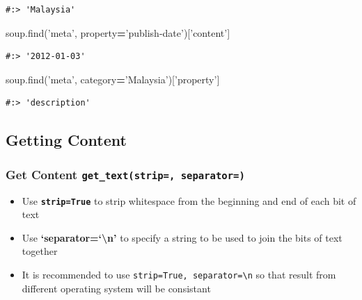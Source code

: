 \documentclass[
]{book}
\newenvironment{Shaded}{\begin{snugshade}}{\end{snugshade}}
\newcommand{\BuiltInTok}[1]{#1}
\newcommand{\NormalTok}[1]{#1}
\newcommand{\OperatorTok}[1]{\textcolor[rgb]{0.43,0.43,0.43}{\textbf{#1}}}
\newcommand{\StringTok}[1]{\textcolor[rgb]{0.5,0.5,0.5}{#1}}
\providecommand{\tightlist}{%
  \setlength{\itemsep}{0pt}\setlength{\parskip}{0pt}}
\begin{document}
\begin{verbatim}
#:> 'Malaysia'
\end{verbatim}

\begin{Shaded}
\begin{Highlighting}[]
\NormalTok{soup.find(}\StringTok{'meta'}\NormalTok{, }\BuiltInTok{property}\OperatorTok{=}\StringTok{'publish-date'}\NormalTok{)[}\StringTok{'content'}\NormalTok{]}
\end{Highlighting}
\end{Shaded}

\begin{verbatim}
#:> '2012-01-03'
\end{verbatim}

\begin{Shaded}
\begin{Highlighting}[]
\NormalTok{soup.find(}\StringTok{'meta'}\NormalTok{, category}\OperatorTok{=}\StringTok{'Malaysia'}\NormalTok{)[}\StringTok{'property'}\NormalTok{]}
\end{Highlighting}
\end{Shaded}

\begin{verbatim}
#:> 'description'
\end{verbatim}

\hypertarget{getting-content}{%
\subsection{Getting Content}\label{getting-content}}

\hypertarget{get-content-get_textstrip-separator}{%
\subsubsection{\texorpdfstring{Get Content \texttt{get\_text(strip=,\ separator=)}}{Get Content get\_text(strip=, separator=)}}\label{get-content-get_textstrip-separator}}

\begin{itemize}
\tightlist
\item
  Use \textbf{\texttt{strip=True}} to strip whitespace from the beginning and end of each bit of text\\
\item
  Use \textbf{`separator=`\textbackslash n'} to specify a string to be used to join the bits of text together
\item
  It is recommended to use \texttt{strip=True,\ separator=\textquotesingle{}\textbackslash{}n\textquotesingle{}} so that result from different operating system will be consistant
\end{itemize}
\end{document}
